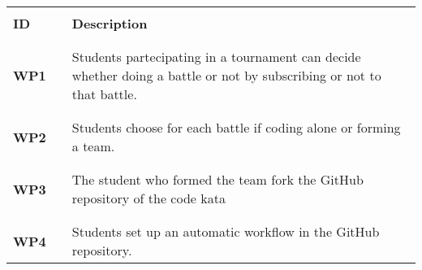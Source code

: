 \renewcommand{\arraystretch}{0.5}
\begin{table}[H]
    \centering
    \begin{longtable}{l l p{12cm}}
        \hline
                     &        &                                                                                                                                                             \\
        \textbf{ID}  & \vline & \textbf{Description}                                                                                                                                        \\
                     &        &                                                                                                                                                             \\\hline & & \\
        \textbf{WP1} & \vline & Students partecipating in a tournament can decide whether doing a battle or not by subscribing or not to that battle.                                       \\
                     &        &                                                                                                                                                             \\\hline & & \\
        \textbf{WP2} & \vline & Students choose for each battle if coding alone or forming a team.                                                                                          \\
                     &        &                                                                                                                                                             \\\hline & & \\
        \textbf{WP3} & \vline & The student who formed the team fork the GitHub repository of the code kata                                                                                 \\
                     &        &                                                                                                                                                             \\\hline & & \\
        \textbf{WP4} & \vline & Students set up an automatic workflow in the GitHub repository.                                                                                             \\

\end{longtable}
\end{table}
